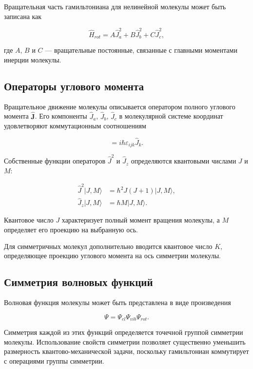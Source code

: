Вращательная часть гамильтониана для нелинейной молекулы
может быть записана как

\begin{equation}
\hat{H}_{rot} =
A\hat{J}_a^2 +
B\hat{J}_b^2 +
C\hat{J}_c^2 ,
\end{equation}

где $A$, $B$ и $C$ — вращательные постоянные,
связанные с главными моментами инерции молекулы.

\subsection{Операторы углового момента}

Вращательное движение молекулы описывается оператором
полного углового момента $\hat{\mathbf{J}}$.
Его компоненты $\hat{J}_a$, $\hat{J}_b$, $\hat{J}_c$
в молекулярной системе координат удовлетворяют
коммутационным соотношениям

\begin{equation}
[\hat{J}_i,\hat{J}_j] = i\hbar \varepsilon_{ijk}\hat{J}_k .
\end{equation}

Собственные функции операторов $\hat{J}^2$ и $\hat{J}_z$
определяются квантовыми числами $J$ и $M$:

\begin{align}
\hat{J}^2 |J,M\rangle &= \hbar^2 J(J+1)|J,M\rangle, \\
\hat{J}_z |J,M\rangle &= \hbar M |J,M\rangle .
\end{align}

Квантовое число $J$ характеризует полный момент вращения молекулы,
а $M$ определяет его проекцию на выбранную ось.

Для симметричных молекул дополнительно вводится
квантовое число $K$, определяющее проекцию
углового момента на ось симметрии молекулы.

\subsection{Симметрия волновых функций}

Волновая функция молекулы может быть представлена
в виде произведения

\begin{equation}
\Psi = \Psi_{el}\Psi_{vib}\Psi_{rot}.
\end{equation}

Симметрия каждой из этих функций определяется
точечной группой симметрии молекулы.
Использование свойств симметрии позволяет существенно
уменьшить размерность квантово-механической задачи,
поскольку гамильтониан коммутирует с операциями
группы симметрии.

